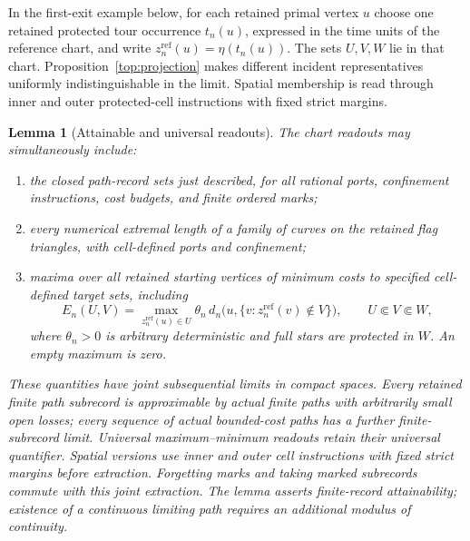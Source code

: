 \documentclass[11pt]{article}
\numberwithin{equation}{section}
\newtheorem{lemma}[theorem]{Lemma}
\theoremstyle{definition}
\theoremstyle{remark}
\newcommand{\1}{\mathbf 1}
\begin{document}
In the first-exit example below, for each retained primal vertex $u$
choose one retained protected tour occurrence $t_n(u)$, expressed in the
time units of the reference chart, and write
$z_n^{\mathrm{ref}}(u)=\eta(t_n(u))$. The sets $U,V,W$ lie in that chart.
Proposition~\ref{top:projection} makes different incident representatives
uniformly indistinguishable in the limit. Spatial membership is read
through inner and outer protected-cell instructions with fixed strict margins.

\begin{lemma}[Attainable and universal readouts]\label{ker:readouts}
The chart readouts may simultaneously include:
\begin{enumerate}
\item the closed path-record sets just described, for all rational
ports, confinement instructions, cost budgets, and finite ordered marks;
\item every numerical extremal length of a family of curves on the
retained flag triangles, with cell-defined ports and confinement;
\item maxima over all retained starting vertices of minimum costs to
specified cell-defined target sets, including
\[
 E_n(U,V)=\max_{z_n^{\mathrm{ref}}(u)\in U}
       \theta_n\,d_n\bigl(u,\{v:z_n^{\mathrm{ref}}(v)\notin V\}\bigr),
 \qquad U\Subset V\Subset W,
\]
where \(\theta_n>0\) is arbitrary deterministic and full stars are protected
in \(W\).  An empty maximum is zero.
\end{enumerate}
These quantities have joint subsequential limits in compact spaces.
Every retained finite path subrecord is approximable by actual finite
paths with arbitrarily small open losses; every sequence of actual
bounded-cost paths has a further finite-subrecord limit.  Universal
maximum--minimum readouts retain their universal quantifier.  Spatial
versions use inner and outer cell instructions with fixed strict
margins before extraction.  Forgetting marks and taking marked
subrecords commute with this joint extraction.  The lemma asserts
finite-record attainability; existence of a continuous limiting path
requires an additional modulus of continuity.
\end{lemma}
\end{document}
